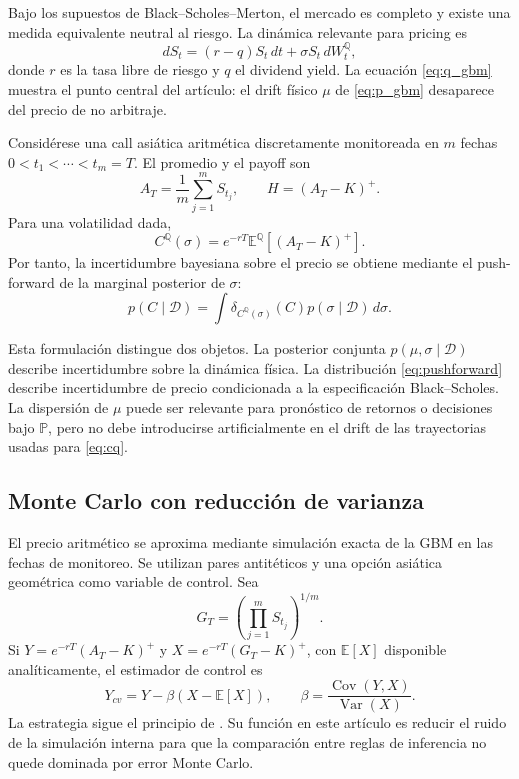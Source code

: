 \documentclass[12pt,letterpaper]{article}
\newcommand{\Pmeasure}{\mathbb{P}}
\newcommand{\Qmeasure}{\mathbb{Q}}
\newcommand{\E}{\mathbb{E}}
\newcommand{\Var}{\operatorname{Var}}
\begin{document}
Bajo los supuestos de Black--Scholes--Merton, el mercado es completo y existe una medida equivalente neutral al riesgo. La dinámica relevante para pricing es
\begin{equation}
 dS_t=(r-q)S_t\,dt+\sigma S_t\,dW_t^{\Qmeasure},
 \label{eq:q_gbm}
\end{equation}
donde $r$ es la tasa libre de riesgo y $q$ el dividend yield. La ecuación \eqref{eq:q_gbm} muestra el punto central del artículo: el drift físico $\mu$ de \eqref{eq:p_gbm} desaparece del precio de no arbitraje.

Considérese una call asiática aritmética discretamente monitoreada en $m$ fechas $0<t_1<\cdots<t_m=T$. El promedio y el payoff son
\begin{equation}
 A_T=\frac{1}{m}\sum_{j=1}^{m}S_{t_j},
 \qquad
 H=(A_T-K)^+.
\end{equation}
Para una volatilidad dada,
\begin{equation}
 C^{\Qmeasure}(\sigma)
 =e^{-rT}\E^{\Qmeasure}\left[(A_T-K)^+\right].
 \label{eq:cq}
\end{equation}
Por tanto, la incertidumbre bayesiana sobre el precio se obtiene mediante el push-forward de la marginal posterior de $\sigma$:
\begin{equation}
 p(C\mid\mathcal D)
 =\int
 \delta_{C^{\Qmeasure}(\sigma)}(C)
 p(\sigma\mid\mathcal D)\,d\sigma.
 \label{eq:pushforward}
\end{equation}

Esta formulación distingue dos objetos. La posterior conjunta $p(\mu,\sigma\mid\mathcal D)$ describe incertidumbre sobre la dinámica física. La distribución \eqref{eq:pushforward} describe incertidumbre de precio condicionada a la especificación Black--Scholes. La dispersión de $\mu$ puede ser relevante para pronóstico de retornos o decisiones bajo $\Pmeasure$, pero no debe introducirse artificialmente en el drift de las trayectorias usadas para \eqref{eq:cq}.

\subsection{Monte Carlo con reducción de varianza}

El precio aritmético se aproxima mediante simulación exacta de la GBM en las fechas de monitoreo. Se utilizan pares antitéticos y una opción asiática geométrica como variable de control. Sea
\begin{equation}
 G_T=\left(\prod_{j=1}^{m}S_{t_j}\right)^{1/m}.
\end{equation}
Si $Y=e^{-rT}(A_T-K)^+$ y $X=e^{-rT}(G_T-K)^+$, con $\E[X]$ disponible analíticamente, el estimador de control es
\begin{equation}
 Y_{cv}=Y-\beta\left(X-\E[X]\right),
 \qquad
 \beta=\frac{\operatorname{Cov}(Y,X)}{\Var(X)}.
 \label{eq:cv}
\end{equation}
La estrategia sigue el principio de \citet{kemnavorst1990}. Su función en este artículo es reducir el ruido de la simulación interna para que la comparación entre reglas de inferencia no quede dominada por error Monte Carlo.
\end{document}
